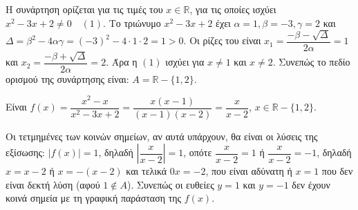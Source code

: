 
\begin{alist}
\item 
\begin{rlist}
\item Η συνάρτηση ορίζεται για τις τιμές του $x \in \mathbb{R}$, για τις οποίες ισχύει $x^2 - 3x + 2 \ne 0 \quad (1)$.
Το τριώνυμο $x^2 - 3x + 2$ έχει $\alpha = 1, \beta = -3, \gamma = 2$ και $\Delta = \beta^2 - 4\alpha\gamma = (-3)^2 - 4 \cdot 1 \cdot 2 = 1 > 0$.
Οι ρίζες του είναι $x_1 = \dfrac{-\beta - \sqrt{\Delta}}{2\alpha} = 1$ και $x_2 = \dfrac{-\beta + \sqrt{\Delta}}{2\alpha} = 2$.
Άρα η $(1)$ ισχύει για $x \ne 1$ και $x \ne 2$. Συνεπώς το πεδίο ορισμού της συνάρτησης είναι:
$A = \mathbb{R} - \{1, 2\}$.

\item Είναι $f(x) = \dfrac{x^2 - x}{x^2 - 3x + 2} = \dfrac{x(x - 1)}{(x - 1)(x - 2)} = \dfrac{x}{x - 2}$, $x \in \mathbb{R} - \{1, 2\}$.
\end{rlist}

\item Οι τετμημένες των κοινών σημείων, αν αυτά υπάρχουν, θα είναι οι λύσεις της εξίσωσης:
$|f(x)| = 1$, δηλαδή $\left|\dfrac{x}{x - 2}\right| = 1$, οπότε $\dfrac{x}{x - 2} = 1$ ή $\dfrac{x}{x - 2} = -1$, δηλαδή
$x = x - 2$ ή $x = -(x - 2)$ και τελικά
$0x = -2$, που είναι αδύνατη ή $x = 1$ που δεν είναι δεκτή λύση (αφού $1 \notin A$).
Συνεπώς οι ευθείες $y = 1$ και $y = -1$ δεν έχουν κοινά σημεία με τη γραφική παράσταση της $f(x)$.
\end{alist}

